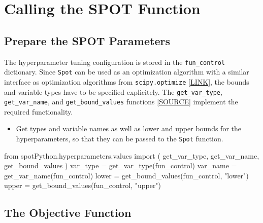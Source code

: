 \documentclass[
  letterpaper,
  DIV=11,
  numbers=noendperiod]{scrreprt}
\newenvironment{Shaded}{\begin{snugshade}}{\end{snugshade}}
\newcommand{\ImportTok}[1]{\textcolor[rgb]{0.00,0.46,0.62}{#1}}
\newcommand{\NormalTok}[1]{\textcolor[rgb]{0.00,0.23,0.31}{#1}}
\newcommand{\OperatorTok}[1]{\textcolor[rgb]{0.37,0.37,0.37}{#1}}
\newcommand{\StringTok}[1]{\textcolor[rgb]{0.13,0.47,0.30}{#1}}
\providecommand{\tightlist}{%
  \setlength{\itemsep}{0pt}\setlength{\parskip}{0pt}}\usepackage{longtable,booktabs,array}
\begin{document}
\hypertarget{calling-the-spot-function-2}{%
\section{Calling the SPOT Function}\label{calling-the-spot-function-2}}

\hypertarget{prepare-the-spot-parameters-2}{%
\subsection{Prepare the SPOT
Parameters}\label{prepare-the-spot-parameters-2}}

The hyperparameter tuning configuration is stored in the
\texttt{fun\_control} dictionary. Since \texttt{Spot} can be used as an
optimization algorithm with a similar interface as optimization
algorithms from \texttt{scipy.optimize}
\href{https://docs.scipy.org/doc/scipy/reference/optimize.html\#module-scipy.optimize}{{[}LINK{]}},
the bounds and variable types have to be specified explicitely. The
\texttt{get\_var\_type}, \texttt{get\_var\_name}, and
\texttt{get\_bound\_values} functions
\href{https://github.com/sequential-parameter-optimization/spotPython/blob/main/src/spotPython/hyperparameters/values.py}{{[}SOURCE{]}}
implement the required functionality.

\begin{itemize}
\tightlist
\item
  Get types and variable names as well as lower and upper bounds for the
  hyperparameters, so that they can be passed to the \texttt{Spot}
  function.
\end{itemize}

\begin{Shaded}
\begin{Highlighting}[]
\ImportTok{from}\NormalTok{ spotPython.hyperparameters.values }\ImportTok{import}\NormalTok{ (}
\NormalTok{    get\_var\_type,}
\NormalTok{    get\_var\_name,}
\NormalTok{    get\_bound\_values}
\NormalTok{    )}
\NormalTok{var\_type }\OperatorTok{=}\NormalTok{ get\_var\_type(fun\_control)}
\NormalTok{var\_name }\OperatorTok{=}\NormalTok{ get\_var\_name(fun\_control)}
\NormalTok{lower }\OperatorTok{=}\NormalTok{ get\_bound\_values(fun\_control, }\StringTok{"lower"}\NormalTok{)}
\NormalTok{upper }\OperatorTok{=}\NormalTok{ get\_bound\_values(fun\_control, }\StringTok{"upper"}\NormalTok{)}
\end{Highlighting}
\end{Shaded}

\hypertarget{sec-the-objective-function-13}{%
\subsection{The Objective
Function}\label{sec-the-objective-function-13}}
\end{document}
